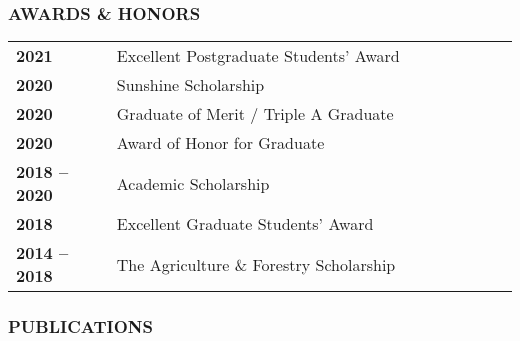 \documentclass[12pt]{article}
\begin{document}
\subsubsection*{AWARDS \& HONORS}\label{Awards & Honors}

\renewcommand\arraystretch{1.5}\tabcolsep=0pt
\begin{longtable}{p{0.2\linewidth}p{0.8\linewidth}}
    \textbf{2021}            &     Excellent Postgraduate Students' Award\\
    \textbf{2020}            &     Sunshine Scholarship \\
    \textbf{2020}            &     Graduate of Merit / Triple A Graduate \\
    \textbf{2020}            &     Award of Honor for Graduate \\
    \textbf{2018 -- 2020}    &     Academic Scholarship \\
    \textbf{2018}            &     Excellent Graduate Students' Award\\
    \textbf{2014 -- 2018}    &     The Agriculture \& Forestry Scholarship \\
    
\end{longtable}

\vspace{0.5cm}


\subsubsection*{PUBLICATIONS}\label{Publications}
\vspace{0.45cm}
\end{document}
